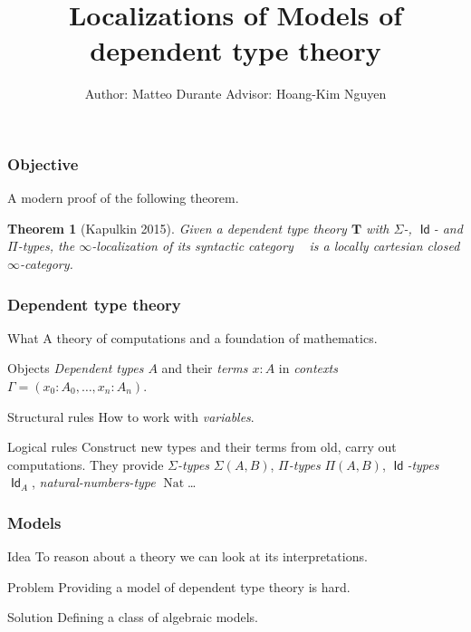 \documentclass{beamer}
\title{Localizations of Models of dependent type theory}
\author{Author: Matteo Durante \quad\quad\quad Advisor: Hoang-Kim Nguyen}
\institute{Regensburg University}
\DeclareMathOperator{\Id}{\mathsf{Id}}
\DeclareMathOperator{\nat}{Nat}
\DeclareMathOperator{\Syn}{\mathsf{Syn}(\mathbf{T})}
\begin{document}
\theoremstyle{plain}

\newtheorem{thm}{Theorem}[section]
\newtheorem{prop}{Proposition}[section]
\newtheorem{defn}{Definition}[section]
\newtheorem{conj}{Conjecture}[section]
\newtheorem{lem}{Lemma}[section]
\newtheorem{construction}{Construction}[section]

\frame{\titlepage}

\begin{frame}
  \frametitle{Objective}

  A modern proof of the following theorem.

  \begin{thm}[Kapulkin 2015]
    Given a dependent type theory $\mathbf{T}$ with $\Sigma$-, $\Id$- and
    $\Pi$-types, the $\infty$-localization of its syntactic category $\Syn$ is a
    locally cartesian closed $\infty$-category.
  \end{thm}
\end{frame}

\begin{frame}
  \frametitle{Dependent type theory}
  
  \begin{block}{What}
    A theory of computations and a foundation of mathematics.
  \end{block}
  \pause

  \begin{block}{Objects}
    \emph{Dependent types $A$} and their \emph{terms $x:A$} in \emph{contexts
    $\Gamma=(x_0:A_0,\ldots,x_n:A_n)$}.
  \end{block}
  \pause

  \begin{block}{Structural rules}
    How to work with \emph{variables}.
  \end{block}
  \pause

  \begin{block}{Logical rules}
    Construct new types and their terms from old, carry out
    computations. They provide \emph{$\Sigma$-types}
    $\Sigma(A,B)$, \emph{$\Pi$-types}
    $\Pi(A,B)$, \emph{$\Id$-types} $\Id_A$, \emph{natural-numbers-type}
    $\nat$\ldots
  \end{block}
\end{frame}

\begin{frame}
  \frametitle{Models}

  \begin{block}{Idea}
    To reason about a theory we can look at its interpretations.
  \end{block}
  \pause

  \begin{block}{Problem}
    Providing a model of dependent type theory is hard.
  \end{block}
  \pause

  \begin{block}{Solution}
    Defining a class of algebraic models.
  \end{block}
\end{frame}
\end{document}
